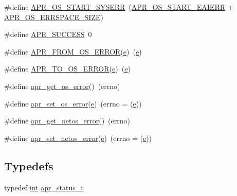 \begin{DoxyCompactItemize}
\item 
\#define \hyperlink{group__apr__errno_gad70a5cad6862a9abcc254d35e827ac8b}{A\+P\+R\+\_\+\+O\+S\+\_\+\+S\+T\+A\+R\+T\+\_\+\+S\+Y\+S\+E\+RR}~(\hyperlink{group__apr__errno_ga2d04991cb57c67a896e22125a1f22b49}{A\+P\+R\+\_\+\+O\+S\+\_\+\+S\+T\+A\+R\+T\+\_\+\+E\+A\+I\+E\+RR} + \hyperlink{group__apr__errno_gadb8d97e6836ccdc57b43b6119a5acccf}{A\+P\+R\+\_\+\+O\+S\+\_\+\+E\+R\+R\+S\+P\+A\+C\+E\+\_\+\+S\+I\+ZE})
\item 
\#define \hyperlink{group__apr__errno_ga9ee311b7bf1c691dc521d721339ee2a6}{A\+P\+R\+\_\+\+S\+U\+C\+C\+E\+SS}~0
\item 
\#define \hyperlink{group__apr__errno_ga2096daff578ef301e060b80c7a4525bf}{A\+P\+R\+\_\+\+F\+R\+O\+M\+\_\+\+O\+S\+\_\+\+E\+R\+R\+OR}(\hyperlink{pcregrep_8txt_acd90314acb2c2e5cd19681136c08efac}{e})~(\hyperlink{pcregrep_8txt_acd90314acb2c2e5cd19681136c08efac}{e})
\item 
\#define \hyperlink{group__apr__errno_ga2385cae04b04afbdcb65f1a45c4d8506}{A\+P\+R\+\_\+\+T\+O\+\_\+\+O\+S\+\_\+\+E\+R\+R\+OR}(\hyperlink{pcregrep_8txt_acd90314acb2c2e5cd19681136c08efac}{e})~(\hyperlink{pcregrep_8txt_acd90314acb2c2e5cd19681136c08efac}{e})
\item 
\#define \hyperlink{group__apr__errno_gaa76e122da00af0ce2e8c8d7ff538bdfa}{apr\+\_\+get\+\_\+os\+\_\+error}()~(errno)
\item 
\#define \hyperlink{group__apr__errno_ga9a2d9a03ad314b03a142574be6d7d8a7}{apr\+\_\+set\+\_\+os\+\_\+error}(\hyperlink{pcregrep_8txt_acd90314acb2c2e5cd19681136c08efac}{e})~(errno = (\hyperlink{pcregrep_8txt_acd90314acb2c2e5cd19681136c08efac}{e}))
\item 
\#define \hyperlink{group__apr__errno_ga66e54f155b4a80ac7df9118af9bd896a}{apr\+\_\+get\+\_\+netos\+\_\+error}()~(errno)
\item 
\#define \hyperlink{group__apr__errno_gaafc38481621653ece6f592f9c5a9a09b}{apr\+\_\+set\+\_\+netos\+\_\+error}(\hyperlink{pcregrep_8txt_acd90314acb2c2e5cd19681136c08efac}{e})~(errno = (\hyperlink{pcregrep_8txt_acd90314acb2c2e5cd19681136c08efac}{e}))
\end{DoxyCompactItemize}
\subsection*{Typedefs}
\begin{DoxyCompactItemize}
\item 
typedef \hyperlink{pcre_8txt_a42dfa4ff673c82d8efe7144098fbc198}{int} \hyperlink{group__apr__errno_gaa5105fa83cc322f09382292db8b47593}{apr\+\_\+status\+\_\+t}
\end{DoxyCompactItemize}
